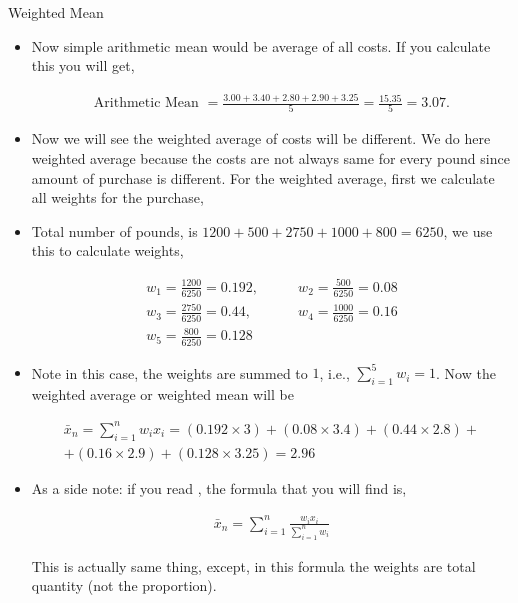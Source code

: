 \documentclass[8pt, usepdftitle=false]{beamer}
\begin{document}
\begin{frame}[allowframebreaks]{Weighted Mean}
\begin{itemize}
\item Now simple arithmetic mean would be average of all costs. If you calculate this you will get,

\begin{align*}
   \text { Arithmetic Mean }=\frac{3.00+3.40+2.80+2.90+3.25}{5}=\frac{15.35}{5}=3.07 \text {. }
 \end{align*} 



\item Now we will see the weighted average of costs will be different. We do here weighted average because the costs are not always same for every pound since amount of purchase is different. For the weighted average, first we calculate all weights for the purchase,

\item Total number of pounds, is $1200+500+2750+1000+800 = 6250$, we use this to calculate weights,

\begin{align*}
  w_1 = \frac{1200}{6250} = 0.192 , &\qquad  w_2 = \frac{500}{6250} = 0.08 \\
  w_3 = \frac{2750}{6250} = 0.44, &\qquad w_4 = \frac{1000}{6250} = 0.16 \\
  w_5 = \frac{800}{6250} = 0.128
\end{align*}

\item Note in this case, the weights are summed to $1$, i.e., $\sum_{i = 1}^{5} w_i = 1$. Now the weighted average or weighted mean will be 

\begin{align*}
  \bar{x}_n  = \sum_{i = 1}^{n} w_i x_i = (0.192 \times 3) + (0.08 \times 3.4) + (0.44 \times 2.8) + \\
  + (0.16 \times 2.9) + (0.128 \times 3.25)  = 2.96
\end{align*}


\framebreak

\item[] As a side note: if you read \citet*{anderson_statistics_2020}, the formula that you will find is, 

\begin{align}\label{eq:weighted_mean2}
    \bar{x}_n=\sum_{i = 1}^{n} \frac{w_i x_i}{\sum_{i = 1}^{n}w_i}
\end{align}

This is actually same thing, except, in this formula the weights are total quantity (not the proportion). 


\end{itemize}
\end{frame}
\end{document}
